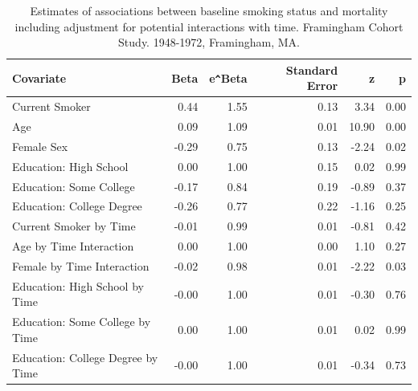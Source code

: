 \documentclass{article}\usepackage[]{graphicx}\usepackage[]{color}
\begin{document}
\begin{table}[H]
\centering
\parbox{11cm}{\caption{Estimates of associations between baseline smoking status and mortality including adjustment for potential interactions with time. Framingham Cohort Study. 1948-1972, Framingham, MA.}} 
\begin{tabular}{lrrrrr}
  \hline
Covariate & Beta & e\verb|^|Beta & Standard Error & z & p \\ 
  \hline
Current Smoker & 0.44 & 1.55 & 0.13 & 3.34 & 0.00 \\ 
  Age & 0.09 & 1.09 & 0.01 & 10.90 & 0.00 \\ 
  Female Sex & -0.29 & 0.75 & 0.13 & -2.24 & 0.02 \\ 
  Education: High School & 0.00 & 1.00 & 0.15 & 0.02 & 0.99 \\ 
  Education: Some College & -0.17 & 0.84 & 0.19 & -0.89 & 0.37 \\ 
  Education: College Degree & -0.26 & 0.77 & 0.22 & -1.16 & 0.25 \\ 
  Current Smoker by Time & -0.01 & 0.99 & 0.01 & -0.81 & 0.42 \\ 
  Age by Time Interaction & 0.00 & 1.00 & 0.00 & 1.10 & 0.27 \\ 
  Female by Time Interaction & -0.02 & 0.98 & 0.01 & -2.22 & 0.03 \\ 
  Education: High School by Time & -0.00 & 1.00 & 0.01 & -0.30 & 0.76 \\ 
  Education: Some College by Time & 0.00 & 1.00 & 0.01 & 0.02 & 0.99 \\ 
  Education: College Degree by Time & -0.00 & 1.00 & 0.01 & -0.34 & 0.73 \\ 
   \hline
\end{tabular}
\end{table}
\end{document}
